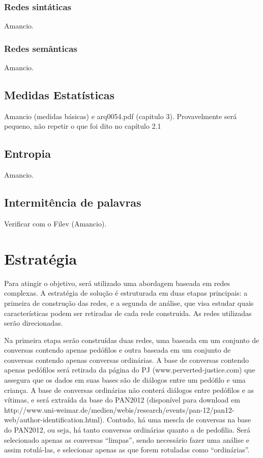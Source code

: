 \documentclass[xindy,rascunho]{fei}
\begin{document}
\subsection{Redes sintáticas}
Amancio.

\subsection{Redes semânticas}
Amancio.

\section{Medidas Estatísticas}
Amancio (medidas básicas) e arq0054.pdf (capitulo 3). Provavelmente será pequeno, não repetir o que foi dito no capítulo 2.1

\section{Entropia}
Amancio.

\section{Intermitência de palavras}
Verificar com o Filev (Amancio).

\chapter{Estratégia}
Para atingir o objetivo, será utilizado uma abordagem baseada em redes complexas. A estratégia de solução é estruturada em duas etapas principais: a primeira de construção das redes, e a segunda de análise, que visa estudar quais características podem ser retiradas de cada rede construida. As redes utilizadas serão direcionadas.

Na primeira etapa serão construídas duas redes, uma baseada em um conjunto de conversas contendo apenas pedófilos e outra baseada em um conjunto de conversas contendo apenas conversas ordinárias. A base de conversas contendo apenas pedófilos será retirada da página do PJ (www.perverted-justice.com) que assegura que os dados em suas bases são de diálogos entre um pedófilo e uma criança. A base de conversas ordinárias não conterá diálogos entre pedófilos e as vítimas, e será extraída da base do PAN2012 (disponível para download em http://www.uni-weimar.de/medien/webis/research/events/pan-12/pan12-web/author-identification.html). Contudo, há uma mescla de conversas na base do PAN2012, ou seja, há tanto conversas ordinárias quanto a de pedofilia. Será selecionado apenas as conversas “limpas”, sendo necessário fazer uma análise e assim rotulá-las, e selecionar apenas as que forem rotuladas como “ordinárias”. 
\end{document}
